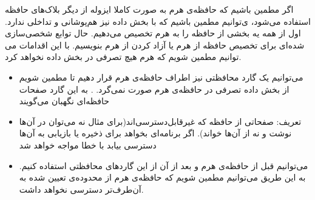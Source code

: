 \documentclass[]{article}
\begin{document}
\begin{enumerate}[(A)]
            اگر مطمین باشیم که حافظه‌ی هرم به صورت کاملا ایزوله از دیگر بلاک‌های حافظه استفاده می‌شود،
            ی‌توانیم مطمین باشیم که با بخش داده نیز هم‌پوشانی و تداخلی ندارد. اول از همه یه بخشی از حافظه را به هرم تخصیص می‌دهیم.
            حال  توابع شخصی‌سازی شده‌ای برای تخصیص حافظه از هرم یا آزاد کردن از هرم بنویسیم. با این اقدامات می توانیم مطمین شویم که هرم هیچ تصرفی در بخش داده نخواهد کرد.
            \begin{itemize}
                  \renewcommand\labelitemi{-}
                  \item  می‌توانیم یک گارد محافظتی  نیز اطراف حافظه‌ی هرم قرار دهیم تا مطمین شویم از بخش داده‌ تصرفی در حافظه‌ی هرم صورت نمی‌گرد.
                        . به این گارد صفحات حافظه‌ای نگهبان
                        می‌گویند
                  \item تعریف: صفحاتی از حافظه که غیرقابل‌دسترسی‌اند(برای مثال نه می‌توان در آن‌ها نوشت و نه از آن‌ها خواند). اگر برنامه‌ای بخواهد برای ذخیره یا بازیابی به آن‌ها دسترسی بیابد با خطا مواجه خواهد شد
                  \item  می‌توانیم قبل از حافظه‌ی هرم و بعد از آن از این گارد‌های محافظتی استفاده کنیم.
                        به این طریق می‌توانیم مطمین شویم که حافظه‌ی هرم از محدوده‌ی تعیین شده به آن‌طرف‌تر دسترسی نخواهد داشت.
            \end{itemize}
\end{enumerate}
\end{document}
